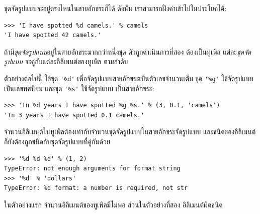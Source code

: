 
ชุดจัดรูปแบบจะอยู่ตรงไหนในสายอักขระก็ได้
ดังนั้น เราสามารถฝั่งค่าเข้าไปในประโยคได้:

\begin{verbatim}
>>> 'I have spotted %d camels.' % camels
'I have spotted 42 camels.'
\end{verbatim}
%
%
ถ้ามี\textit{ชุดจัดรูปแบบ}อยู่ในสายอักขระมากกว่าหนึ่งชุด
ตัวถูกดำเนินการที่สอง ต้องเป็นทูเพิล
แต่ละ\textit{ชุดจัดรูปแบบ} จะคู่กับแต่ละอิลิเมนต์ของทูเพิล ตามลำดับ


ตัวอย่างต่อไปนี้ ใช้ชุด \verb|'%d'| เพื่อจัดรูปแบบสายอักขระเป็นตัวเลขจำนวนเต็ม
ชุด \verb|'%g'| ใช้จัดรูปแบบ เป็นเลขทศนิยม
และชุด \verb|'%s'| ใช้จัดรูปแบบ เป็นสายอักขระ:

\begin{verbatim}
>>> 'In %d years I have spotted %g %s.' % (3, 0.1, 'camels')
'In 3 years I have spotted 0.1 camels.'
\end{verbatim}
%
%
จำนวนอิลิเมนต์ในทูเพิลต้องเท่ากับจำนวนชุดจัดรูปแบบในสายอักขระจัดรูปแบบ
และชนิดของอิลิเมนต์ ก็ยังต้องถูกชนิดกับชุดจัดรูปแบบที่คู่กันด้วย


\begin{verbatim}
>>> '%d %d %d' % (1, 2)
TypeError: not enough arguments for format string
>>> '%d' % 'dollars'
TypeError: %d format: a number is required, not str
\end{verbatim}
%
%
ในตัวอย่างแรก จำนวนอิลิเมนต์ของทูเพิลมีไม่พอ
ส่วนในตัวอย่างที่สอง อิลิเมนต์ผิดชนิด


